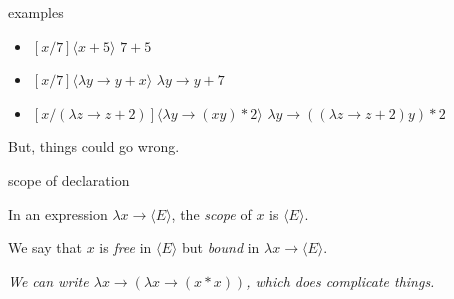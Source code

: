 \begin{frame}{examples}

\begin{itemize}
   \pause \item $[x/7]\langle x + 5 \rangle$  \hspace{20pt} \pause $7 + 5$
   \pause \item $[x/7]\langle \lambda y \rightarrow y + x \rangle$   \hspace{20pt} \pause $\lambda y \rightarrow y + 7$
   \pause \item $[x/(\lambda z \rightarrow z + 2)]\langle \lambda y \rightarrow (x y) * 2 \rangle$ 
\hspace{20pt} \pause  $\lambda y \rightarrow ((\lambda z \rightarrow z + 2) y) * 2$ 
 \end{itemize}

\pause\vspace{20pt}

But, things could go wrong.

\end{frame}

\begin{frame}{scope of declaration}

\pause

  In an expression $\lambda x \rightarrow  \langle E \rangle$, the {\em scope} of $x$
  is $\langle E \rangle$. 

\pause\vspace{10pt}

  We say that $x$ is {\em free} in $\langle E \rangle$ but {\em bound} in
  $\lambda x \rightarrow \langle E \rangle$.

\pause\vspace{60pt}

{\em We can write $\lambda x \rightarrow ( \lambda x \rightarrow (x*x))$, which does complicate things.}

\end{frame}


